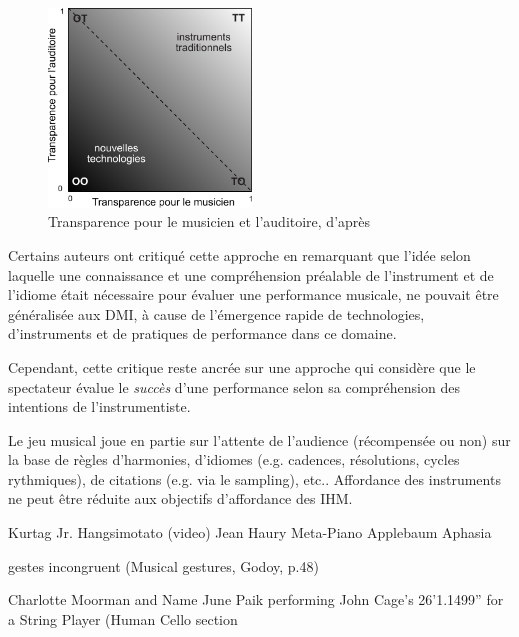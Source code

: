 \begin{figure}
	\begin{center}
 		\includegraphics[width=0.48\textwidth]{gfx/03_gesture/Fels-transparency.pdf}
	\end{center}
	\caption{Transparence pour le musicien et l'auditoire, d'après \cite{fels_mapping_2002}}
	\label{fig:gesture:fels_transparency}
\end{figure}

Certains auteurs ont critiqué cette approche \cite{fyans_where_2009} en remarquant que l'idée selon laquelle une connaissance et une compréhension préalable de l'instrument et de l'idiome était nécessaire pour évaluer une performance musicale, ne pouvait être généralisée aux DMI, à cause de l'émergence rapide de technologies, d'instruments et de pratiques de performance dans ce domaine. 

Cependant, cette critique reste ancrée sur une approche qui considère que le spectateur évalue le \textit{succès} d'une performance selon sa compréhension des intentions de l'instrumentiste.


Le jeu musical joue en partie sur l’attente de l’audience (récompensée ou non) sur la base de règles d'harmonies, d’idiomes (e.g. cadences, résolutions, cycles rythmiques), de citations (e.g. via le sampling), etc..
Affordance des instruments ne peut être réduite aux objectifs d’affordance des IHM.


Kurtag Jr. Hangsimotato (video)
Jean Haury Meta-Piano
Applebaum Aphasia

gestes incongruent (Musical gestures, Godoy, p.48)


Charlotte Moorman and Name June Paik performing John Cage’s 26’1.1499” for a String Player (Human Cello section





